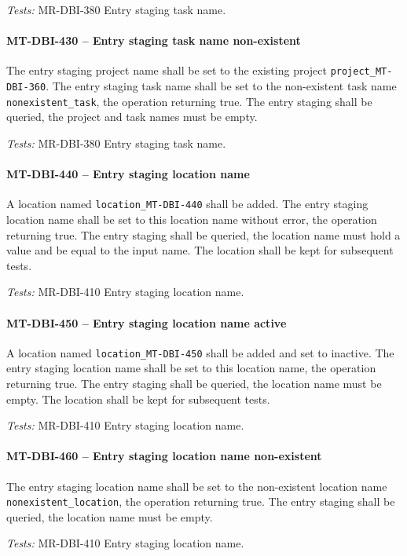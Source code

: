 \textit{Tests: } MR-DBI-380 Entry staging task name.

\paragraph{MT-DBI-430 -- Entry staging task name non-existent}
The entry staging project name shall be set to the existing
project \lstinline{project_MT-DBI-360}.
The entry staging task name shall be set to the non-existent task
name \lstinline{nonexistent_task}, the operation returning true.
The entry staging shall be queried, the project and task names
must be empty.

\textit{Tests: } MR-DBI-380 Entry staging task name.

\paragraph{MT-DBI-440 -- Entry staging location name}
A location named \lstinline{location_MT-DBI-440} shall be added.
The entry staging location name shall be set to this location
name without error, the operation returning true.
The entry staging shall be queried, the location name must
hold a value and be equal to the input name.
The location shall be kept for subsequent tests.

\textit{Tests: } MR-DBI-410 Entry staging location name.

\paragraph{MT-DBI-450 -- Entry staging location name active}
A location named \lstinline{location_MT-DBI-450} shall
be added and set to inactive.
The entry staging location name shall be set to this location
name, the operation returning true.
The entry staging shall be queried, the location name must be empty.
The location shall be kept for subsequent tests.

\textit{Tests: } MR-DBI-410 Entry staging location name.

\paragraph{MT-DBI-460 -- Entry staging location name non-existent}
The entry staging location name shall be set to
the non-existent location name \lstinline{nonexistent_location},
the operation returning true.
The entry staging shall be queried, the location name must be empty.

\textit{Tests: } MR-DBI-410 Entry staging location name.

